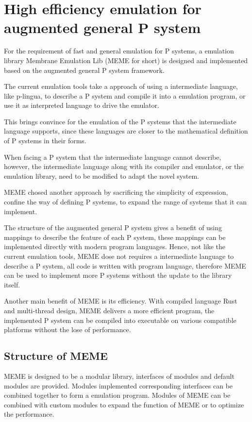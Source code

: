 \documentclass[9pt,a4paper,twoside]{article}
\begin{document}
    \section{High efficiency emulation for augmented general P system}

    For the requirement of fast and general emulation for P systems, a emulation library Membrane Emulation Lib (MEME for short) 
    is designed and implemented based on the augmented general P system framework.

    The current emulation tools take a approach of using a intermediate language, like p-lingua, 
    to describe a P system and compile it into a emulation program, or use it as interpreted language to drive the emulator. 
    
    This brings convince for the emulation of the P systems that the intermediate language supports, 
    since these languages are closer to the mathematical definition of P systems in their forms.

    When facing a P system that the intermediate language cannot describe, however,
    the intermediate language along with its compiler and emulator, or the emulation library, need to be modified to adapt the novel system.

    MEME chosed another approach by sacrificing the simplicity of expression, confine the way of defining P systems, to expand the range of systems that
     it can implement.

    The structure of the augmented general P system gives a benefit of using mappings to describe the feature of each P system, 
    these mappings can be implemented directly with modern program languages. Hence, not like the current emulation tools,
     MEME dose not requires a intermediate language to describe a P system, all code is written with program language, 
     therefore MEME can be used to implement more P systems without the update to the library itself.

    Another main benefit of MEME is its efficiency. With compiled language Rust and multi-thread design,
     MEME delivers a more efficient program,
      the implemented P system can be compiled into executable on various compatible platforms without the lose of performance.

    \subsection{Structure of MEME}
    MEME is designed to be a modular library, interfaces of modules and default modules are provided. 
    Modules implemented corresponding interfaces can be combined together to form a emulation program.
    Modules of MEME can be combined with custom modules to expand the function of MEME or to optimize the performance.
    
\end{document}
